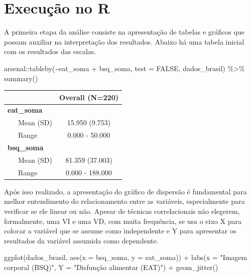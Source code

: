 \documentclass[
]{book}
\newenvironment{Shaded}{\begin{snugshade}}{\end{snugshade}}
\newcommand{\AttributeTok}[1]{\textcolor[rgb]{0.77,0.63,0.00}{#1}}
\newcommand{\ConstantTok}[1]{\textcolor[rgb]{0.00,0.00,0.00}{#1}}
\newcommand{\FunctionTok}[1]{\textcolor[rgb]{0.00,0.00,0.00}{#1}}
\newcommand{\NormalTok}[1]{#1}
\newcommand{\SpecialCharTok}[1]{\textcolor[rgb]{0.00,0.00,0.00}{#1}}
\newcommand{\StringTok}[1]{\textcolor[rgb]{0.31,0.60,0.02}{#1}}
\begin{document}
\hypertarget{execuuxe7uxe3o-no-r-13}{%
\section{Execução no R}\label{execuuxe7uxe3o-no-r-13}}

A primeira etapa da análise consiste na apresentação de tabelas e gráficos que possam auxiliar na interpretação dos resultados. Abaixo há uma tabela inicial com os resultados das escalas.

\begin{Shaded}
\begin{Highlighting}[]
\NormalTok{arsenal}\SpecialCharTok{::}\FunctionTok{tableby}\NormalTok{(}\SpecialCharTok{\textasciitilde{}}\NormalTok{eat\_soma }\SpecialCharTok{+}\NormalTok{ bsq\_soma, }
                 \AttributeTok{test =} \ConstantTok{FALSE}\NormalTok{, dados\_brasil) }\SpecialCharTok{\%\textgreater{}\%} 
  \FunctionTok{summary}\NormalTok{() }
\end{Highlighting}
\end{Shaded}

\begin{longtable}[]{@{}lc@{}}
\toprule
& Overall (N=220) \\
\midrule
\endhead
\textbf{eat\_soma} & \\
~~~Mean (SD) & 15.950 (9.753) \\
~~~Range & 0.000 - 50.000 \\
\textbf{bsq\_soma} & \\
~~~Mean (SD) & 81.359 (37.003) \\
~~~Range & 0.000 - 188.000 \\
\bottomrule
\end{longtable}

Após isso realizado, a apresentação do gráfico de dispersão é fundamental para melhor entendimento do relacionamento entre as variáveis, especialmente para verificar se ele linear ou não. Apesar de técnicas correlacionais não elegerem, formalmente, uma VI e uma VD, com muita frequência, se usa o eixo X para colocar a variável que se assume como independente e Y para apresentar os resultados da variável assumida como dependente.

\begin{Shaded}
\begin{Highlighting}[]
\FunctionTok{ggplot}\NormalTok{(dados\_brasil, }\FunctionTok{aes}\NormalTok{(}\AttributeTok{x =}\NormalTok{ bsq\_soma, }\AttributeTok{y =}\NormalTok{ eat\_soma)) }\SpecialCharTok{+}
  \FunctionTok{labs}\NormalTok{(}\AttributeTok{x =} \StringTok{"Imagem corporal (BSQ)"}\NormalTok{, }
       \AttributeTok{Y =} \StringTok{"Disfunção alimentar (EAT)"}\NormalTok{) }\SpecialCharTok{+}
  \FunctionTok{geom\_jitter}\NormalTok{()}
\end{Highlighting}
\end{Shaded}
\end{document}
